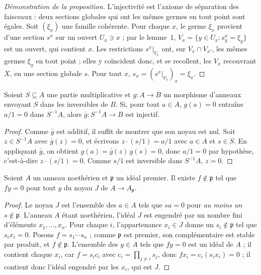 \begin{proof}[Démonstration de la proposition]
L'injectivité est l'axiome de séparation des faisceaux : deux sections globales qui ont les mêmes germes en tout point sont égales. Soit $(\xi_x)$ une famille cohérente. Pour chaque $x$, le germe $\xi_x$ provient d'une section $s^x$ sur un ouvert $U_x \ni x$ ; par le lemme~1, $V_x = \{y \in U_x : s^x_y = \xi_y\}$ est un ouvert, qui contient $x$. Les restrictions $s^x|_{V_x}$ ont, sur $V_x \cap V_{x'}$, les mêmes germes $\xi_y$ en tout point ; elles y coïncident donc, et se recollent, les $V_x$ recouvrant $X$, en une section globale $s$. Pour tout $x$, $s_x = (s^x|_{V_x})_x = \xi_x$.
\end{proof}

\begin{lemme}\label{lem:42-lift}
Soient $S \subseteq A$ une partie multiplicative et $g : A \to B$ un morphisme d'anneaux envoyant $S$ dans les inversibles de $B$. Si, pour tout $a \in A$, $g(a) = 0$ entraîne $a/1 = 0$ dans $S^{-1}A$, alors $\bar g : S^{-1}A \to B$ est injectif.
\end{lemme}

\begin{proof}
Comme $\bar g$ est additif, il suffit de montrer que son noyau est nul. Soit $z \in S^{-1}A$ avec $\bar g(z) = 0$, et écrivons $z \cdot (s/1) = a/1$ avec $a \in A$ et $s \in S$. En appliquant $\bar g$, on obtient $g(a) = \bar g(z)\, g(s) = 0$, donc $a/1 = 0$ par hypothèse, c'est-à-dire $z \cdot (s/1) = 0$. Comme $s/1$ est inversible dans $S^{-1}A$, $z = 0$.
\end{proof}

\begin{lemme}\label{lem:42-tue}
Soient $A$ un anneau noethérien et $\mathfrak p$ un idéal premier. Il existe $f \notin \mathfrak p$ tel que $fy = 0$ pour tout $y$ du noyau $J$ de $A \to A_{\mathfrak p}$.
\end{lemme}

\begin{proof}
Le noyau $J$ est l'ensemble des $a \in A$ tels que $sa = 0$ pour \emph{au moins un} $s \notin \mathfrak p$. L'anneau $A$ étant noethérien, l'idéal $J$ est engendré par un nombre fini d'éléments $x_1, \dots, x_n$. Pour chaque $i$, l'appartenance $x_i \in J$ donne un $s_i \notin \mathfrak p$ tel que $s_i x_i = 0$. Posons $f = s_1 \cdots s_n$ ; comme $\mathfrak p$ est premier, son complémentaire est stable par produit, et $f \notin \mathfrak p$. L'ensemble des $y \in A$ tels que $fy = 0$ est un idéal de $A$ ; il contient chaque $x_i$, car $f = s_i c_i$ avec $c_i = \prod_{j \neq i} s_j$, donc $f x_i = c_i (s_i x_i) = 0$ ; il contient donc l'idéal engendré par les $x_i$, qui est $J$.
\end{proof}

